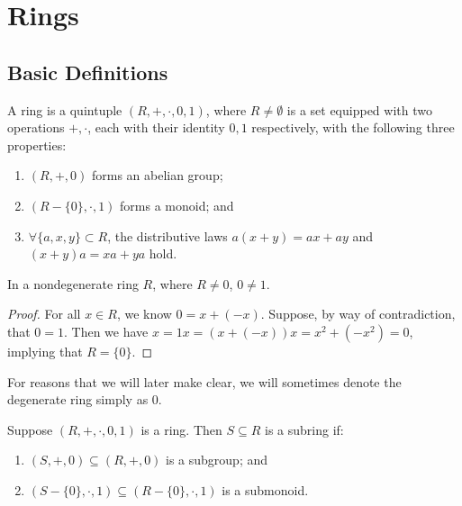 \chapter{Rings}\label{sec:rings}

\section{Basic Definitions}

\begin{definition}
    A ring is a quintuple \((R,+,\cdot,0,1)\),
    where \(R \neq \emptyset\) is a set
    equipped with two operations \(+,\cdot\),
    each with their identity \(0,1\) respectively,
    with the following three properties:
    \begin{enumerate}[label={(\roman*)}, itemsep=0mm]
        \item \((R,+,0)\) forms an abelian group;
        \item \((R - \{0\},\cdot,1)\) forms a monoid; and
        \item \(\forall \{a,x,y\} \subset R\),
            the distributive laws \(a(x+y) = ax + ay\)
            and \((x+y)a = xa + ya\) hold.
    \end{enumerate}
\end{definition}
\begin{proposition}
    In a nondegenerate ring \(R\), where \(R \neq 0\), \(0 \neq 1\).
\end{proposition}
\begin{proof}
    For all \(x \in R\), we know \(0 = x + (-x)\).
    Suppose, by way of contradiction, that \(0 = 1\).
    Then we have \(x = 1x = (x+(-x))x = x^2 + (-x^2) = 0\),
    implying that \(R = \{0\}\).
\end{proof}
\begin{remark}
    For reasons that we will later make clear,
    we will sometimes denote the degenerate ring simply as 0.
\end{remark}

\begin{definition}
    Suppose \((R,+,\cdot,0,1)\) is a ring.
    Then \(S \subseteq R\) is a subring if:
    \begin{enumerate}[label={(\roman*)}, itemsep=0mm]
        \item \((S,+,0) \subseteq (R,+,0)\) is a subgroup; and
        \item \((S - \{0\},\cdot,1) \subseteq (R - \{0\},\cdot,1)\) is a submonoid.
    \end{enumerate}
\end{definition}

